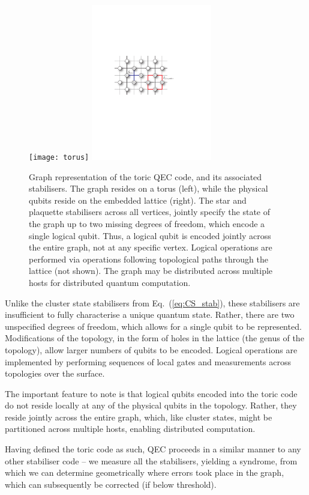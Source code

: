 \begin{figure}[!htb]
	\texttt{[image: torus]}
	\includegraphics[width=0.47\textwidth]{toric_code}
	\caption{Graph representation of the toric QEC code, and its associated stabilisers. The graph resides on a torus (left), while the physical qubits reside on the embedded lattice (right). The star and plaquette stabilisers across all vertices, jointly specify the state of the graph up to two missing degrees of freedom, which encode a single logical qubit. Thus, a logical qubit is encoded jointly across the entire graph, not at any specific vertex. Logical operations are performed via operations following topological paths through the lattice (not shown). The graph may be distributed across multiple hosts for distributed quantum computation.} \label{fig:toric_code}
\end{figure}

Unlike the cluster state stabilisers from Eq.~(\ref{eq:CS_stab}), these stabilisers are insufficient to fully characterise a unique quantum state. Rather, there are two unspecified degrees of freedom, which allows for a single qubit to be represented. Modifications of the topology, in the form of holes in the lattice (the genus of the topology), allow larger numbers of qubits to be encoded. Logical operations are implemented by performing sequences of local gates and measurements across topologies over the surface.

The important feature to note is that logical qubits encoded into the toric code do not reside locally at any of the physical qubits in the topology. Rather, they reside jointly across the entire graph, which, like cluster states, might be partitioned across multiple hosts, enabling distributed computation.

Having defined the toric code as such, QEC proceeds in a similar manner to any other stabiliser code -- we measure all the stabilisers, yielding a syndrome, from which we can determine geometrically where errors took place in the graph, which can subsequently be corrected (if below threshold).

